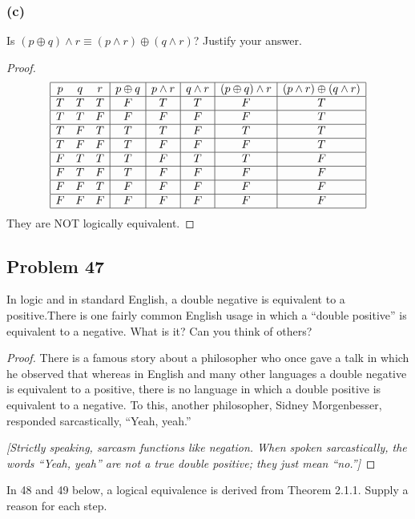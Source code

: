 \documentclass[14pt]{extarticle}
\begin{document}
\subsubsection{(c)}
Is $(p \oplus q) \wedge r \equiv (p \wedge r) \oplus (q \wedge r)$? Justify your answer.

\begin{proof}
$$
\begin{array}{|ccc|c|c|c|c|c|}
\hline
p & q & r & p \oplus q & p \wedge r & q \wedge r & 
(p \oplus q) \wedge r & (p \wedge r) \oplus (q \wedge r) \\
\hline
T & T & T & F & T & T & F & T \\
\hline
T & T & F & F & F & F & F & T \\
\hline
T & F & T & T & T & F & T & T \\
\hline
T & F & F & T & F & F & F & T \\
\hline
F & T & T & T & F & T & T & F \\
\hline
F & T & F & T & F & F & F & F \\
\hline
F & F & T & F & F & F & F & F \\
\hline
F & F & F & F & F & F & F & F \\
\hline
\end{array}
$$
They are NOT logically equivalent.
\end{proof}

\subsection{Problem 47}
In logic and in standard English, a double negative is equivalent to a positive.There is one fairly common English usage in which a “double positive” is equivalent to a negative. What is it? Can you think of others?

\begin{proof}
There is a famous story about a philosopher who once gave a talk in which he observed that whereas in English and many other languages a double negative is equivalent to a positive, there is no language in which a double positive is equivalent to a negative. To this, another philosopher, Sidney Morgenbesser,
responded sarcastically, “Yeah, yeah.”

{\it [Strictly speaking, sarcasm functions like negation. When spoken sarcastically, the words “Yeah, yeah” are not a true double positive; they just mean “no.”]}
\end{proof}

In 48 and 49 below, a logical equivalence is derived from Theorem 2.1.1. Supply a reason for each step.
\end{document}
